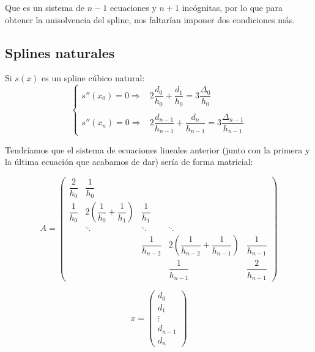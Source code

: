\noindent
Que es un sistema de $n-1$ ecuaciones y $n+1$ incógnitas, por lo que para obtener la unisolvencia
del spline, nos faltarían imponer dos condiciones más.

\subsection{Splines naturales}
\noindent
Si $s(x)$ es un spline cúbico natural:
$$\left\{ \begin{array}{ll}
        s''(x_0)=0 \Rightarrow & 2\dfrac{d_0}{h_0}+\dfrac{d_1}{h_0} = 3\dfrac{\Delta_0}{h_0}                       \\
        \                                                                                                          \\
        s''(x_n)=0 \Rightarrow & 2\dfrac{d_{n-1}}{h_{n-1}}+\dfrac{d_{n}}{h_{n-1}} = 3\dfrac{\Delta_{n-1}}{h_{n-1}}
    \end{array} \right.$$

\noindent
Tendríamos que el sistema de ecuaciones lineales anterior (junto con la primera y la última ecuación
que acabamos de dar) sería de forma matricial:

$$A=\left( \begin{array}{ccccc}
            \dfrac{2}{h_0} & \dfrac{1}{h_0}                                  &                    &                                                         &                    \\
            \dfrac{1}{h_0} & 2\left( \dfrac{1}{h_0} + \dfrac{1}{h_1} \right) & \dfrac{1}{h_1}     &                                                         &                    \\
                           & \ddots                                          & \ddots             & \ddots                                                  &                    \\
                           &                                                 & \dfrac{1}{h_{n-2}} & 2\left( \dfrac{1}{h_{n-2}} + \dfrac{1}{h_{n-1}} \right) & \dfrac{1}{h_{n-1}} \\
                           &                                                 &                    & \dfrac{1}{h_{n-1}}                                      & \dfrac{2}{h_{n-1}}
        \end{array} \right)$$

$$x=\left( \begin{array}{c}
            d_0     \\
            d_1     \\
            \vdots  \\
            d_{n-1} \\
            d_{n}
        \end{array} \right)$$

